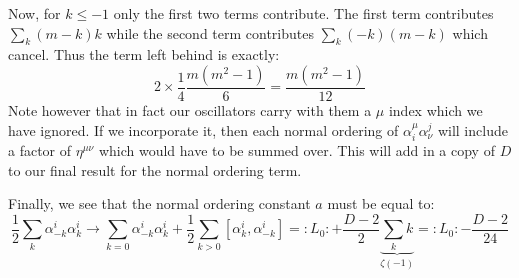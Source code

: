 \documentclass[11pt, class=article, crop=false]{standalone}
\begin{document}
\begin{enumerate}
	 Now, for $k \leq -1$ only the first two terms contribute. The first term contributes $\sum_k (m-k) k$ while the second term contributes $\sum_k (-k) (m-k)$ which cancel. Thus the term left behind is exactly:
	 \begin{equation}
	 	2 \times \frac14 \frac{m(m^2 - 1)}{6} = \frac{m(m^2 - 1)}{12}
	 \end{equation}
	 Note however that in fact our oscillators carry with them a $\mu$ index which we have ignored. If we incorporate it, then each normal ordering of $\alpha_i^\mu \alpha^j_\nu$ will include a factor of $\eta^{\mu \nu}$ which would have to be summed over. This will add in a copy of $D$ to our final result for the normal ordering term.
	 
	 Finally, we see that the normal ordering constant $a$ must be equal to:
	 \begin{equation}
	 	\frac12 \sum_{k} \alpha_{-k}^i \alpha^i_k \to \sum_{k=0} \alpha_{-k}^i \alpha^i_{k} + \frac12 \sum_{k>0} [\alpha^i_{k}, \alpha^i_{-k}] = :L_0: + \frac{D-2}{2} \underbrace{\sum_k k}_{\zeta(-1)} = :L_0: -\frac{D-2}{24}
	 \end{equation}


\end{enumerate}
\end{document}
